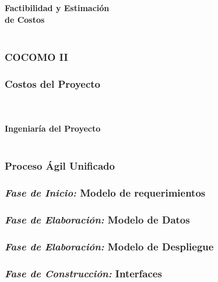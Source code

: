 \documentclass[xcolor=dvipsnames]{beamer}
\begin{document}
\begin{frame}
    \centering\color{color3}{\rule{10cm}{5pt}}\\
    \vspace{-3mm}
    \centering\color{color3}{\rule{10cm}{1.5pt}}\\
    \vspace{2mm}
    \centering\textbf{\huge{\textcolor{color1}{Factibilidad y Estimación\\ de Costos}}}\\
    \centering\color{color3}{\rule{10cm}{1.5pt}}\\
\end{frame}

\begin{frame}
    \frametitle{COCOMO II}
\end{frame}

\begin{frame}
    \frametitle{Costos del Proyecto}
\end{frame}

\begin{frame}
    \centering\color{color3}{\rule{10cm}{5pt}}\\
    \vspace{-3mm}
    \centering\color{color3}{\rule{10cm}{1.5pt}}\\
    \vspace{2mm}
    \centering\textbf{\huge{\textcolor{color1}{Ingeniaría del Proyecto}}}\\
    \centering\color{color3}{\rule{10cm}{1.5pt}}\\
\end{frame}

\begin{frame}
    \frametitle{Proceso Ágil Unificado}
\end{frame}

\begin{frame}
    \frametitle{\textit{Fase de Inicio:} Modelo de requerimientos}
\end{frame}

\begin{frame}
    \frametitle{\textit{Fase de Elaboración:} Modelo de Datos}
\end{frame}

\begin{frame}
    \frametitle{\textit{Fase de Elaboración:} Modelo de Despliegue}
\end{frame}

\begin{frame}
    \frametitle{\textit{Fase de Construcción:} Interfaces}
\end{frame}
\end{document}
